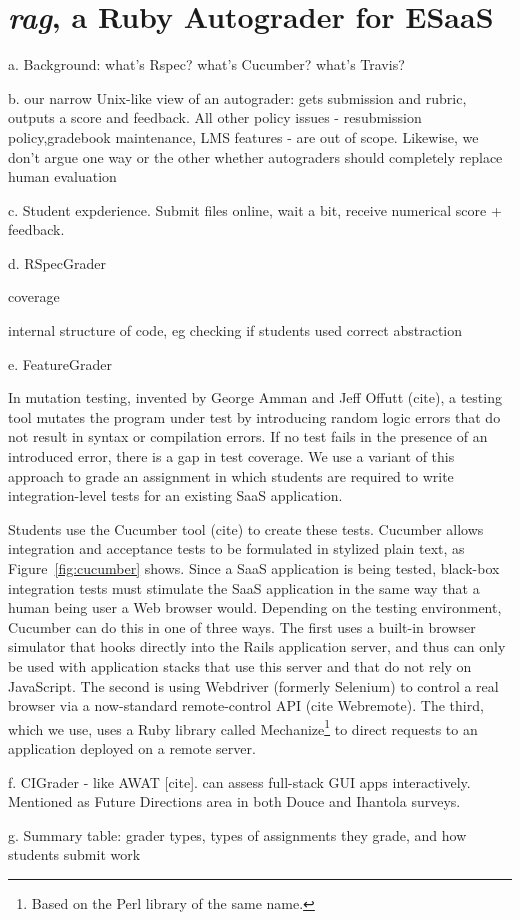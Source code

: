 \section{\emph{rag}, a Ruby Autograder for ESaaS}



a.	Background: what's Rspec? what's Cucumber? what's Travis?

b.	our narrow Unix-like view of an autograder: gets submission and rubric, outputs a score and feedback. All other policy issues - resubmission policy,gradebook maintenance, LMS features - are out of scope.  Likewise, we don't argue one way or the other whether autograders should completely replace human evaluation

c.	Student expderience. Submit files online, wait a bit, receive numerical score + feedback.

d.	RSpecGrader

coverage

internal structure of code, eg checking if students used correct
abstraction 



e.	FeatureGrader


In mutation testing, invented by George Amman and Jeff Offutt (cite), a
testing tool mutates the program under test by introducing random logic
errors that do not result in syntax or compilation errors.  If no test fails
in the presence of an introduced error, there is a gap in test
coverage.  We use a variant of this approach to grade an
assignment in which students are required to write integration-level
tests for an existing SaaS application.

Students use the Cucumber tool (cite) to create these tests.
Cucumber allows integration and acceptance tests to be formulated in
stylized plain text, as Figure~\ref{fig:cucumber} shows.
Since a SaaS application is being tested, black-box integration tests
must stimulate the SaaS application in the same way that
a human being user a Web browser would.
Depending on the testing environment, Cucumber can do this in one of
three ways.  The first uses a built-in browser simulator that hooks
directly into 
the Rails application server, and thus can only be used
with application stacks that use this server and that do not rely on
JavaScript.  The second is using Webdriver (formerly 
Selenium) to control a real browser via a now-standard remote-control
API (cite Webremote).  The third, which we use, uses a Ruby library called
Mechanize\footnote{Based on the Perl library of the same name.} to
direct requests to an application deployed on  a remote server.  


f.	CIGrader - like AWAT [cite]. can assess full-stack GUI apps interactively. Mentioned as Future  Directions area in both Douce and Ihantola surveys.

g.	Summary table: grader types, types of assignments they grade, and how students submit work



